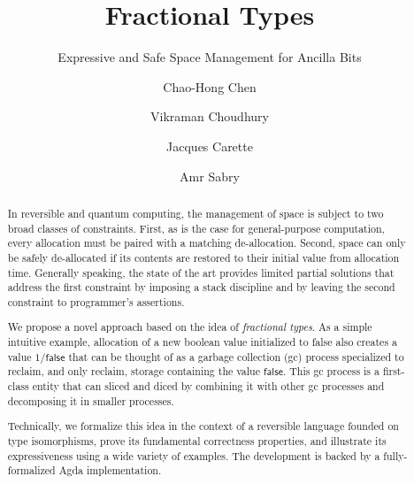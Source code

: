 \documentclass[sigplan,10pt,review,anonymous]{acmart}
\newcommand{\oneover}[1]{1/#1}
\begin{document}
\title{Fractional Types}
\subtitle{Expressive and Safe Space Management for Ancilla Bits}
\author{Chao-Hong Chen}

\author{Vikraman Choudhury}

\author{Jacques Carette}

\author{Amr Sabry}

\begin{abstract}
  In reversible and quantum computing, the management of space is
  subject to two broad classes of constraints. First, as is the case
  for general-purpose computation, every allocation must be paired
  with a matching de-allocation. Second, space can only be safely
  de-allocated if its contents are restored to their initial value
  from allocation time. Generally speaking, the state of the art
  provides limited partial solutions that address the first
  constraint by imposing a stack discipline and by leaving the second
  constraint to programmer's assertions.

  We propose a novel approach based on the idea of \emph{fractional
    types}. As a simple intuitive example, allocation of a new boolean
  value initialized to \textsf{false} also creates a value
  $\oneover{\textsf{false}}$ that can be thought of as a garbage
  collection (gc) process specialized to reclaim, and only reclaim,
  storage containing the value $\textsf{false}$. This gc process is a
  first-class entity that can sliced and diced by combining it with
  other gc processes and decomposing it in smaller
  processes.

  Technically, we formalize this idea in the context of a reversible
  language founded on type isomorphisms, prove its fundamental
  correctness properties, and illustrate its expressiveness using a
  wide variety of examples. The development is backed by a
  fully-formalized Agda implementation.
\end{abstract}

\maketitle






\end{document}
